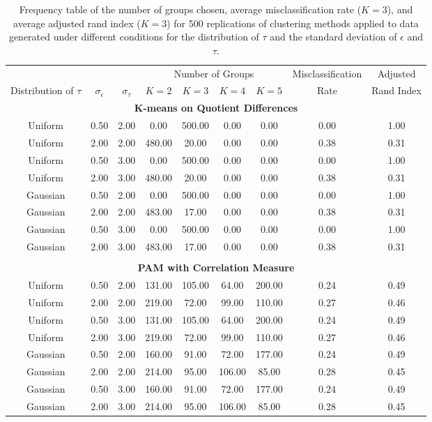 \begin{table}[ht]
\begin{center}
\begin{tabular}{ccc|cccccc}
  \hline &&&\multicolumn{4}{c}{Number of Groups}&Misclassification&Adjusted\\ Distribution of $\tau$&$\sigma_{\epsilon}$&$\sigma_{\tau}$&$K=2$&$K=3$&$K=4$&$K=5$&Rate&Rand Index\\ \hline\multicolumn{9}{c}{\textbf{K-means on Quotient Differences}}\\ Uniform & 0.50 & 2.00 & 0.00 & 500.00 & 0.00 & 0.00 & 0.00 & 1.00 \\ 
  Uniform & 2.00 & 2.00 & 480.00 & 20.00 & 0.00 & 0.00 & 0.38 & 0.31 \\ 
  Uniform & 0.50 & 3.00 & 0.00 & 500.00 & 0.00 & 0.00 & 0.00 & 1.00 \\ 
  Uniform & 2.00 & 3.00 & 480.00 & 20.00 & 0.00 & 0.00 & 0.38 & 0.31 \\ 
  Gaussian & 0.50 & 2.00 & 0.00 & 500.00 & 0.00 & 0.00 & 0.00 & 1.00 \\ 
  Gaussian & 2.00 & 2.00 & 483.00 & 17.00 & 0.00 & 0.00 & 0.38 & 0.31 \\ 
  Gaussian & 0.50 & 3.00 & 0.00 & 500.00 & 0.00 & 0.00 & 0.00 & 1.00 \\ 
  Gaussian & 2.00 & 3.00 & 483.00 & 17.00 & 0.00 & 0.00 & 0.38 & 0.31 \\ 
   \\ \multicolumn{9}{c}{\textbf{PAM with Correlation Measure}}\\Uniform & 0.50 & 2.00 & 131.00 & 105.00 & 64.00 & 200.00 & 0.24 & 0.49 \\ 
  Uniform & 2.00 & 2.00 & 219.00 & 72.00 & 99.00 & 110.00 & 0.27 & 0.46 \\ 
  Uniform & 0.50 & 3.00 & 131.00 & 105.00 & 64.00 & 200.00 & 0.24 & 0.49 \\ 
  Uniform & 2.00 & 3.00 & 219.00 & 72.00 & 99.00 & 110.00 & 0.27 & 0.46 \\ 
  Gaussian & 0.50 & 2.00 & 160.00 & 91.00 & 72.00 & 177.00 & 0.24 & 0.49 \\ 
  Gaussian & 2.00 & 2.00 & 214.00 & 95.00 & 106.00 & 85.00 & 0.28 & 0.45 \\ 
  Gaussian & 0.50 & 3.00 & 160.00 & 91.00 & 72.00 & 177.00 & 0.24 & 0.49 \\ 
  Gaussian & 2.00 & 3.00 & 214.00 & 95.00 & 106.00 & 85.00 & 0.28 & 0.45 \\ 
   \hline\end{tabular}
\caption{Frequency table of the number of groups chosen, average misclassification rate ($K=3$), and average adjusted rand index ($K=3$) for 500 replications of clustering methods applied to data generated under different conditions for the distribution of $\tau$ and the standard deviation of $\epsilon$ and $\tau$.}
\label{tab:freq2}
\end{center}
\end{table}

